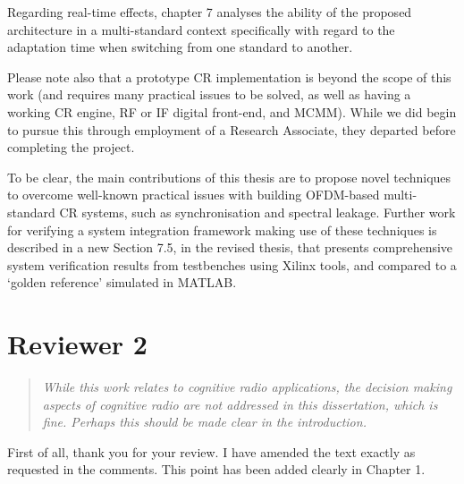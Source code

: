 \documentclass{article}
\begin{document}
Regarding real-time effects, chapter 7 analyses the ability of the proposed architecture in a multi-standard context specifically with regard to the adaptation time when switching from one standard to another. %

Please note also that a prototype CR implementation is beyond the scope of this work (and requires many practical issues to be solved, as well as having a working CR engine, RF or IF digital front-end, and MCMM).
While we did begin to pursue this through employment of a Research Associate, they departed before completing the project.

To be clear, the main contributions of this thesis are to propose novel techniques to overcome well-known practical issues with building OFDM-based multi-standard CR systems, such as synchronisation and spectral leakage. %
Further work for verifying a system integration framework making use of these techniques is described in a new Section 7.5, in the revised thesis, that presents comprehensive system verification results from testbenches using Xilinx tools, and compared to a `golden reference' simulated in MATLAB.


\section*{Reviewer 2}
\begin{quote}
\emph{While this work relates to cognitive radio applications, the decision making aspects of cognitive radio are not addressed in this dissertation, which is fine. Perhaps this should be made clear in the introduction.}
\end{quote}
First of all, thank you for your review. I have amended the text exactly as requested in the comments. This point has been added clearly in Chapter 1.
\end{document}
